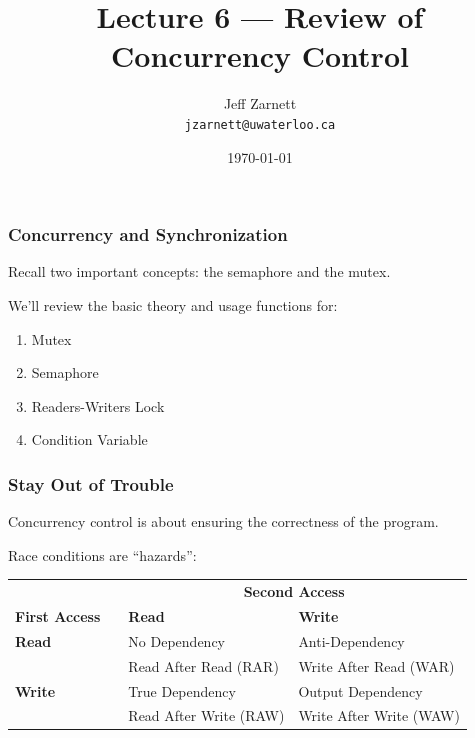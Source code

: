 


\title{Lecture 6 --- Review of Concurrency Control }

\author{Jeff Zarnett \\ \small \texttt{jzarnett@uwaterloo.ca}}
\date{\today}




\begin{frame}
  \titlepage

 \end{frame}

\begin{frame}
\frametitle{Concurrency and Synchronization}

Recall two important concepts: the semaphore and the mutex.

We'll review the basic theory and usage functions for:

\begin{enumerate}
	\item Mutex
	\item Semaphore
	\item Readers-Writers Lock
	\item Condition Variable
\end{enumerate}

\end{frame}

\begin{frame}
\frametitle{Stay Out of Trouble}

Concurrency control is about ensuring the correctness of the program.

Race conditions are ``hazards'':

\begin{center}
\begin{tabular}{ll|l|l}
	& & \multicolumn{2}{c}{\textbf{Second Access}} \\
\textbf{First Access}	& & \textbf{Read} & \textbf{Write} \\ \hline
\textbf{Read}	& & No Dependency & Anti-Dependency \\
	& & Read After Read (RAR) & Write After Read (WAR) \\\hline
\textbf{Write}	& & True Dependency & Output Dependency \\
	& & Read After Write (RAW) & Write After Write (WAW) \\
\end{tabular}
\end{center}

\end{frame}

